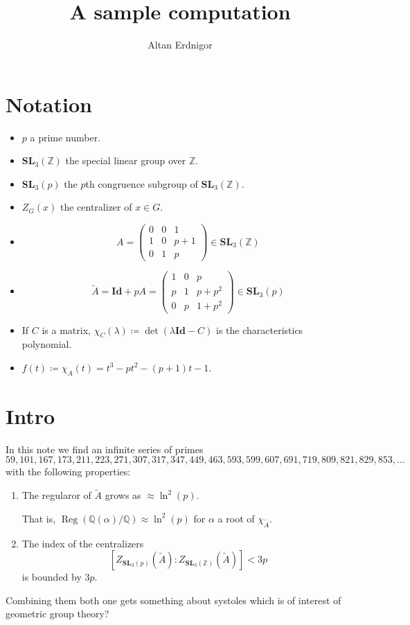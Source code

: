 \documentclass[a4paper]{article}
\DeclareMathOperator{\assign}{\coloneqq}        %
\newcommand{\Q}{\mathbb{Q}}        %
\newcommand{\Id}{\mathbf{Id}}        %
\newcommand{\SL}{\mathbf{SL}_3(\mathbb{Z})}        %
\newcommand{\SLp}{\mathbf{SL}_3(p)}        %
\DeclareMathOperator{\Reg}{Reg}        %
\begin{document}
\title{A sample computation}	
\author{Altan Erdnigor}
\maketitle

\section{Notation}
\begin{itemize}
\item $p$ a prime number.
\item $\SL$ the special linear group over $\mathbb{Z}$.
\item $\SLp$ the $p$th congruence subgroup of $\SL$.
\item $Z_G(x)$ the centralizer of $x \in G$.
\item 
\begin{equation}
\label{matrix_small}
A = 
\begin{pmatrix}
0 & 0 & 1 \\
1 & 0 & p+1 \\
0 & 1 & p
\end{pmatrix}
\in \SL
\end{equation}
\item 
\begin{equation}
\label{matrix_big}
\tilde A = \Id + p A =
\begin{pmatrix}
1 & 0 & p \\
p & 1 & p + p^2 \\
0 & p & 1 + p^2
\end{pmatrix}
\in \SLp
\end{equation}

\item If $C$ is a matrix, $\chi_C(\lambda) \assign \det(\lambda \Id - C)$ is the characteristics polynomial.
\item $ f(t) \assign \chi_A(t) = t^3 - p t^2 - (p + 1) t - 1$.

\end{itemize}

\section{Intro}
In this note we find an infinite series of primes  
\begin{equation}
	\label{the_primes_sequence}
59, 101, 167, 173, 211, 223, 271, 307, 317, 347, 449, 463, 593, 599, 607, 691, 719, 809, 821, 829, 853, \ldots
\end{equation}
with the following properties:
\begin{enumerate}
\item
The regularor of $\tilde A$
grows as $\approx \ln^2(p)$. 

That is, $\Reg ( \Q(\alpha)/\Q ) \approx \ln^2(p) $ for $\alpha$ a root of $\chi_{\tilde A}$.

\item
The index of the centralizers
\[
	[Z_{\SLp}(\tilde A) : Z_{\SL}(\tilde A)] < 3p
\] 
is bounded by $3p$.
\end{enumerate}
Combining them both one gets something about systoles which is of interest of geometric group theory?
\end{document}
